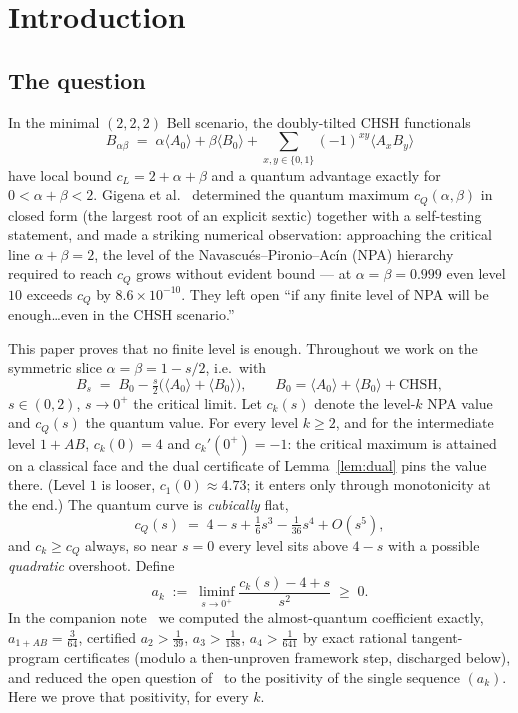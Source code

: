 \documentclass[11pt]{article}
\newcommand{\la}{\langle}
\newcommand{\ra}{\rangle}
\begin{document}
\section{Introduction}\label{sec:intro}

\subsection{The question}

In the minimal $(2,2,2)$ Bell scenario, the doubly-tilted CHSH functionals
\[
B_{\alpha\beta}\;=\;\alpha\la A_0\ra+\beta\la B_0\ra+
\sum_{x,y\in\{0,1\}}(-1)^{xy}\la A_xB_y\ra
\]
have local bound $c_L=2+\alpha+\beta$ and a quantum advantage exactly for
$0<\alpha+\beta<2$. Gigena et al.~\cite{Gigena} determined the quantum
maximum $c_Q(\alpha,\beta)$ in closed form (the largest root of an explicit
sextic) together with a self-testing statement, and made a striking
numerical observation: approaching the critical line $\alpha+\beta=2$, the
level of the Navascu\'es--Pironio--Ac\'in (NPA) hierarchy~\cite{NPA} required
to reach $c_Q$ grows without evident bound --- at $\alpha=\beta=0.999$ even
level $10$ exceeds $c_Q$ by $8.6\times10^{-10}$. They left open ``if any
finite level of NPA will be enough\ldots even in the CHSH scenario.''

This paper proves that no finite level is enough. Throughout we work on the
symmetric slice $\alpha=\beta=1-s/2$, i.e.\ with
\[
B_s\;=\;B_0-\tfrac s2\bigl(\la A_0\ra+\la B_0\ra\bigr),\qquad
B_0=\la A_0\ra+\la B_0\ra+\mathrm{CHSH},
\]
$s\in(0,2)$, $s\to0^+$ the critical limit. Let $c_k(s)$ denote the level-$k$
NPA value and $c_Q(s)$ the quantum value. For every level $k\ge2$, and for
the intermediate level $1{+}AB$, $c_k(0)=4$ and $c_k'(0^+)=-1$: the critical
maximum is attained on a classical face and the dual certificate of
Lemma~\ref{lem:dual} pins the value there. (Level $1$ is looser,
$c_1(0)\approx4.73$; it enters only through monotonicity at the end.) The
quantum curve is \emph{cubically} flat,
\begin{equation}\label{eq:cQ}
c_Q(s)\;=\;4-s+\tfrac{1}{6}s^3-\tfrac1{36}s^4+O(s^5),
\end{equation}
and $c_k\ge c_Q$ always, so near $s=0$ every level sits above $4-s$ with a
possible \emph{quadratic} overshoot. Define
\[
a_k\;:=\;\liminf_{s\to0^+}\frac{c_k(s)-4+s}{s^2}\;\ge\;0 .
\]
In the companion note~\cite{overshoot} we computed the almost-quantum
coefficient exactly, $a_{1+AB}=\tfrac3{64}$, certified $a_2>\tfrac1{39}$,
$a_3>\tfrac1{188}$, $a_4>\tfrac1{641}$ by exact rational tangent-program
certificates (modulo a then-unproven framework step, discharged below), and
reduced the open question of~\cite{Gigena} to the positivity of the single
sequence $(a_k)$. Here we prove that positivity, for every $k$.
\end{document}
